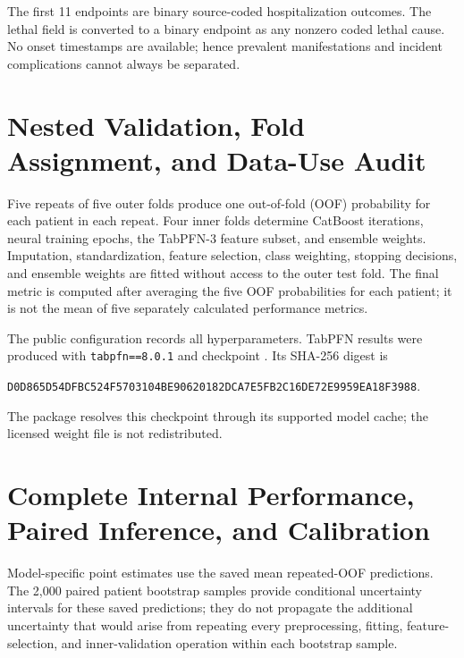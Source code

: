 

The first 11 endpoints are binary source-coded hospitalization outcomes. The lethal field is converted to a binary endpoint as any nonzero coded lethal cause. No onset timestamps are available; hence prevalent manifestations and incident complications cannot always be separated.


\section{Nested Validation, Fold Assignment, and Data-Use Audit}
\label{app:validation}

Five repeats of five outer folds produce one out-of-fold (OOF) probability for each patient in each repeat. Four inner folds determine CatBoost iterations, neural training epochs, the TabPFN-3 feature subset, and ensemble weights. Imputation, standardization, feature selection, class weighting, stopping decisions, and ensemble weights are fitted without access to the outer test fold. The final metric is computed after averaging the five OOF probabilities for each patient; it is not the mean of five separately calculated performance metrics.



The public configuration records all hyperparameters. TabPFN results were produced with \texttt{tabpfn==8.0.1} and checkpoint . Its SHA-256 digest is
\begin{center}
\footnotesize\texttt{D0D865D54DFBC524\allowbreak F5703104BE906201\allowbreak 82DCA7E5FB2C16DE\allowbreak 72E9959EA18F3988}.
\end{center}
The package resolves this checkpoint through its supported model cache; the licensed weight file is not redistributed.

\section{Complete Internal Performance, Paired Inference, and Calibration}
\label{app:internal}

Model-specific point estimates use the saved mean repeated-OOF predictions. The 2,000 paired patient bootstrap samples provide conditional uncertainty intervals for these saved predictions; they do not propagate the additional uncertainty that would arise from repeating every preprocessing, fitting, feature-selection, and inner-validation operation within each bootstrap sample.

